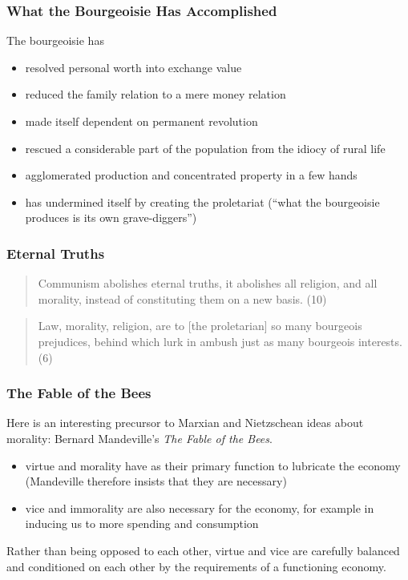 \documentclass[xcolor=dvipsnames]{beamer}
\begin{document}
\begin{frame}
  \frametitle{What the Bourgeoisie Has Accomplished}
The bourgeoisie has
  \begin{itemize}
  \item resolved personal worth into exchange value
  \item reduced the family relation to a mere money relation
  \item made itself dependent on permanent revolution
  \item rescued a considerable part of the population from the idiocy
    of rural life
  \item agglomerated production and concentrated property in a few
    hands
  \item has undermined itself by creating the proletariat (``what the
    bourgeoisie produces is its own grave-diggers'')
  \end{itemize}
\end{frame}

\begin{frame}
  \frametitle{Eternal Truths}
  \begin{quote}
    Communism abolishes eternal truths, it abolishes all religion, and
    all morality, instead of constituting them on a new basis. (10)
  \end{quote}
  \begin{quote}
    Law, morality, religion, are to [the proletarian] so many
    bourgeois prejudices, behind which lurk in ambush just as many
    bourgeois interests. (6)
  \end{quote}
\end{frame}

\begin{frame}
  \frametitle{The Fable of the Bees}
  Here is an interesting precursor to Marxian and Nietzschean ideas
  about morality: Bernard Mandeville's \emph{The Fable of the Bees}.
  \begin{itemize}
  \item virtue and morality have as their primary function to
    lubricate the economy (Mandeville therefore insists that they are
    necessary)
  \item vice and immorality are also necessary for the economy, for
    example in inducing us to more spending and consumption
  \end{itemize}
  Rather than being opposed to each other, virtue and vice are
  carefully balanced and conditioned on each other by the requirements
  of a functioning economy.
\end{frame}
\end{document}
